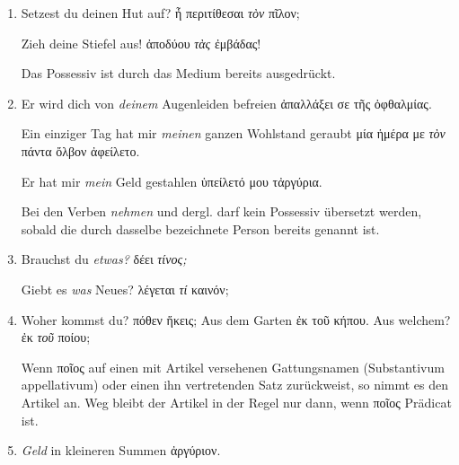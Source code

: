 \begin{enumerate}[leftmargin=0pt,rightmargin=0pt,listparindent =1cm,labelindent=1cm,labelsep=1ex,labelwidth={*},itemindent={*},align=left]
\item Setzest du deinen Hut auf? \textgreek[variant=ancient]{ἦ περιτίθεσαι
\emph{τὸν} πῖλον;}


\begin{continuousitemline}Zieh deine Stiefel aus! \textgreek[variant=ancient]{ἀποδύου
\emph{τὰς} ἐμβάδας!}\par\end{continuousitemline}


Das Possessiv ist durch das Medium bereits ausgedrückt. 

\item Er wird dich von \emph{deinem} Augenleiden befreien \textgreek[variant=ancient]{ἀπαλλάξει
σε τῆς ὀφθαλμίας.}


\begin{continuousitemline}Ein einziger Tag hat mir \emph{meinen}
ganzen Wohlstand geraubt \textgreek[variant=ancient]{μία ἡμέρα με
\emph{τὸν} πάντα ὄλβον ἀφείλετο.}


Er hat mir \emph{mein} Geld gestahlen \textgreek[variant=ancient]{ὑπείλετό
μου τἀργύρια.}\par\end{continuousitemline}


Bei den Verben \emph{nehmen} und dergl. darf kein Possessiv übersetzt
werden, sobald die durch dasselbe bezeichnete Person bereits genannt
ist.

\item Brauchst du \emph{etwas?} \textgreek[variant=ancient]{δέει \emph{τίνος;}}


\begin{continuousitemline}Giebt es \emph{was} Neues? \textgreek[variant=ancient]{λέγεται
\emph{τί} καινόν;}\par\end{continuousitemline}

\item Woher kommst du? \textgreek[variant=ancient]{πόθεν ἥκεις;} Aus dem
Garten \textgreek[variant=ancient]{ἐκ τοῦ κήπου.} Aus welchem? \textgreek[variant=ancient]{ἐκ
\emph{τοῦ} ποίου;}


Wenn \textgreek[variant=ancient]{ποῖος} auf einen mit Artikel versehenen
Gattungsnamen \textlatin{(Substantivum appellativum)} oder einen ihn
vertretenden Satz zurückweist, so nimmt es den Artikel an. Weg bleibt
der Artikel in der Regel nur dann, wenn \textgreek[variant=ancient]{ποῖος}
Prädicat ist. 

\item \emph{Geld} in kleineren Summen \textgreek[variant=ancient]{ἀργύριον.}



\end{enumerate}
